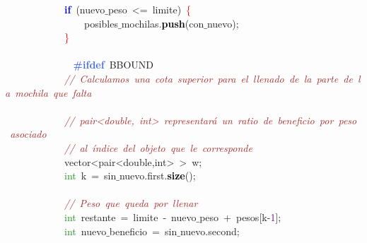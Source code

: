 \mbox{}\ \ \ \ \ \ \ \ \ \ \ \ \textbf{\textcolor{Blue}{if}}\ \textcolor{BrickRed}{(}nuevo$\_$peso\ \textcolor{BrickRed}{\textless{}=}\ limite\textcolor{BrickRed}{)}\ \textcolor{Red}{\{} \\
\mbox{}\ \ \ \ \ \ \ \ \ \ \ \ \ \ \ \ posibles$\_$mochilas\textcolor{BrickRed}{.}\textbf{\textcolor{Black}{push}}\textcolor{BrickRed}{(}con$\_$nuevo\textcolor{BrickRed}{);} \\
\mbox{}\ \ \ \ \ \ \ \ \ \ \ \ \textcolor{Red}{\}} \\
\mbox{}\ \ \ \ \ \ \ \ \ \ \ \  \\
\mbox{}\textbf{\textcolor{RoyalBlue}{\ \ \ \ \ \ \ \ \ \ \ \ \#ifdef}}\ BBOUND \\
\mbox{}\ \ \ \ \ \ \ \ \ \ \ \ \textit{\textcolor{Brown}{//\ Calculamos\ una\ cota\ superior\ para\ el\ llenado\ de\ la\ parte\ de\ la\ mochila\ que\ falta}} \\
\mbox{}\ \ \ \ \ \ \ \ \ \ \ \  \\
\mbox{}\ \ \ \ \ \ \ \ \ \ \ \ \textit{\textcolor{Brown}{//\ pair\textless{}double,\ int\textgreater{}\ representará\ un\ ratio\ de\ beneficio\ por\ peso\ asociado}} \\
\mbox{}\ \ \ \ \ \ \ \ \ \ \ \ \textit{\textcolor{Brown}{//\ al\ índice\ del\ objeto\ que\ le\ corresponde}} \\
\mbox{}\ \ \ \ \ \ \ \ \ \ \ \ \textcolor{TealBlue}{vector\textless{}pair\textless{}double,int\textgreater{}\ \textgreater{}}\ w\textcolor{BrickRed}{;} \\
\mbox{}\ \ \ \ \ \ \ \ \ \ \ \ \textcolor{ForestGreen}{int}\ k\ \textcolor{BrickRed}{=}\ sin$\_$nuevo\textcolor{BrickRed}{.}first\textcolor{BrickRed}{.}\textbf{\textcolor{Black}{size}}\textcolor{BrickRed}{();} \\
\mbox{}\ \ \ \ \ \ \ \ \ \ \ \  \\
\mbox{}\ \ \ \ \ \ \ \ \ \ \ \ \textit{\textcolor{Brown}{//\ Peso\ que\ queda\ por\ llenar}} \\
\mbox{}\ \ \ \ \ \ \ \ \ \ \ \ \textcolor{ForestGreen}{int}\ restante\ \textcolor{BrickRed}{=}\ limite\ \textcolor{BrickRed}{-}\ nuevo$\_$peso\ \textcolor{BrickRed}{+}\ pesos\textcolor{BrickRed}{[}k\textcolor{BrickRed}{-}\textcolor{Purple}{1}\textcolor{BrickRed}{];} \\
\mbox{}\ \ \ \ \ \ \ \ \ \ \ \ \textcolor{ForestGreen}{int}\ nuevo$\_$beneficio\ \textcolor{BrickRed}{=}\ sin$\_$nuevo\textcolor{BrickRed}{.}second\textcolor{BrickRed}{;} \\
\mbox{}\ \ \ \ \ \ \ \ \ \ \ \  \\
